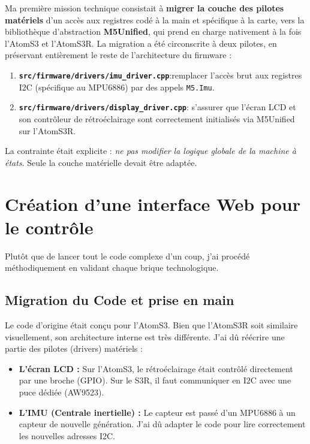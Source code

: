 \documentclass{tropLaClasse}
\begin{document}
Ma première mission technique consistait à \textbf{migrer la couche des pilotes matériels} d'un accès aux registres codé à la main et spécifique à la carte, vers la bibliothèque d'abstraction \textbf{M5Unified}, qui prend en charge nativement à la fois l'AtomS3 et l'AtomS3R. La migration a été circonscrite à deux pilotes, en préservant entièrement le reste de l'architecture du firmware :

\begin{enumerate}
  \item \textbf{\texttt{src/firmware/drivers/imu\_driver.cpp}}:remplacer l'accès brut aux
        registres I2C (spécifique au MPU6886) par des appels \texttt{M5.Imu}.
  \item \textbf{\texttt{src/firmware/drivers/display\_driver.cpp}}: s'assurer que l'écran LCD
        et son contrôleur de rétroéclairage sont correctement initialisés via M5Unified sur
        l'AtomS3R.
\end{enumerate}

La contrainte était explicite : \textit{ne pas modifier la logique globale de la machine à états}. Seule la couche matérielle devait être adaptée.

\section{Création d'une interface Web pour le contrôle}
Plutôt que de lancer tout le code complexe d'un coup, j'ai procédé méthodiquement en validant chaque brique technologique.

\subsection{Migration du Code et prise en main}
Le code d'origine était conçu pour l'AtomS3. Bien que l'AtomS3R soit similaire visuellement, son architecture interne est très différente. J'ai dû réécrire une partie des pilotes (drivers) matériels :
\begin{itemize}
    \item \textbf{L'écran LCD :} Sur l'AtomS3, le rétroéclairage était contrôlé directement par une broche (GPIO). Sur le S3R, il faut communiquer en I2C avec une puce dédiée (AW9523).
    \item \textbf{L'IMU (Centrale inertielle) :} Le capteur est passé d'un MPU6886 à un capteur de nouvelle génération. J'ai dû adapter le code pour lire correctement les nouvelles adresses I2C.
\end{itemize}
\end{document}
